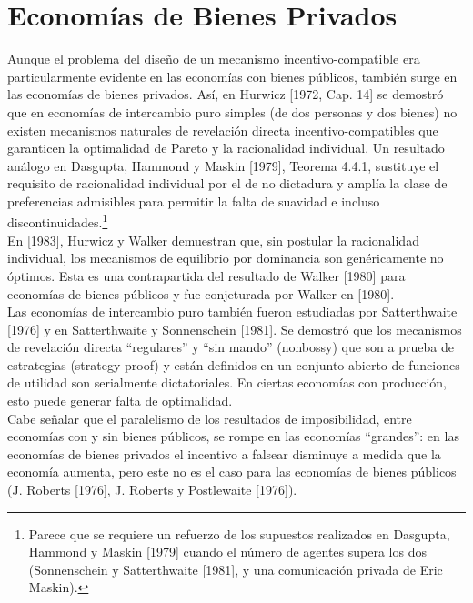 \documentclass[12pt, letterpaper]{article}
\begin{document}
\section*{Economías de Bienes Privados}

Aunque el problema del diseño de un mecanismo incentivo-compatible era particularmente evidente en las economías con bienes públicos, también surge en las economías de bienes privados. Así, en Hurwicz [1972, Cap. 14] se demostró que en economías de intercambio puro simples (de dos personas y dos bienes) no existen mecanismos naturales de revelación directa incentivo-compatibles que garanticen la optimalidad de Pareto y la racionalidad individual. Un resultado análogo en Dasgupta, Hammond y Maskin [1979], Teorema 4.4.1, sustituye el requisito de racionalidad individual por el de no dictadura y amplía la clase de preferencias admisibles para permitir la falta de suavidad e incluso discontinuidades.\footnote{Parece que se requiere un refuerzo de los supuestos realizados en Dasgupta, Hammond y Maskin [1979] cuando el número de agentes supera los dos (Sonnenschein y Satterthwaite [1981], y una comunicación privada de Eric Maskin).} \\

En [1983], Hurwicz y Walker demuestran que, sin postular la racionalidad individual, los mecanismos de equilibrio por dominancia son genéricamente no óptimos. Esta es una contrapartida del resultado de Walker [1980] para economías de bienes públicos y fue conjeturada por Walker en [1980]. \\

Las economías de intercambio puro también fueron estudiadas por Satterthwaite [1976] y en Satterthwaite y Sonnenschein [1981]. Se demostró que los mecanismos de revelación directa ``regulares'' y ``sin mando'' (nonbossy) que son a prueba de estrategias (strategy-proof) y están definidos en un conjunto abierto de funciones de utilidad son serialmente dictatoriales. En ciertas economías con producción, esto puede generar falta de optimalidad. \\

Cabe señalar que el paralelismo de los resultados de imposibilidad, entre economías con y sin bienes públicos, se rompe en las economías ``grandes'': en las economías de bienes privados el incentivo a falsear disminuye a medida que la economía aumenta, pero este no es el caso para las economías de bienes públicos (J. Roberts [1976], J. Roberts y Postlewaite [1976]). \\
\end{document}
